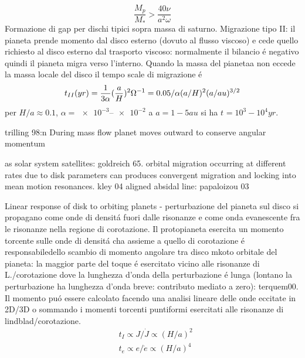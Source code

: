 \begin{workout}
\begin{equation}
\frac{M_p}{M_*}>\frac{40\nu}{a^2\omega}
\end{equation}
Formazione di gap per dischi tipici sopra massa di saturno.
Migrazione tipo II: il pianeta prende momento dal disco esterno (dovuto al flusso viscoso) e cede quello richiesto al disco esterno dal trasporto viscoso: normalmente il bilancio \'e negativo quindi il pianeta migra verso l'interno.
Quando la massa del pianetaa non eccede la massa locale del disco il tempo scale di migrazione \'e
\begin{equation}
t_{II}(yr)=\frac{1}{3\alpha}(\frac{a}{H})^2\Omega^{-1}=0.05/\alpha(a/H)^2(a/au)^{3/2}
\end{equation}
per $H/a\approx0.1$, $\alpha=\numrange{e-3}{e-2}$ a $a=1-5 au$ si ha $t_{}=10^3-10^4yr$.

\end{workout}

\begin{workout}
trilling 98:n During mass flow planet moves outward to conserve angular momentum
\end{workout}

\begin{workout}
as solar system satellites: goldreich 65.
orbital migration occurring at different rates due to disk parameters can produces convergent migration and locking into mean motion resonances.
kley 04
aligned absidal line: papaloizou 03
\end{workout}

\begin{workout}
Linear response of disk to orbiting planets - perturbazione del pianeta sul disco si propagano come onde di densit\'a fuori dalle risonanze e come onda evanescente fra le risonanze nella regione di corotazione. Il protopianeta esercita un momento torcente sulle onde di densit\'a cha assieme  a quello di corotazione \'e responsabiledello scambio di momento angolare tra disco mkoto orbitale del pianeta: la maggior parte del toque \'e esercitato vicino alle risonanze di L./corotazione dove la lunghezza d'onda della perturbazione \'e lunga (lontano la perturbazione ha lunghezza d'onda breve: contributo mediato a zero): terquem00.
Il momento pu\'o essere calcolato facendo una analisi lineare delle onde eccitate in 2D/3D o sommando i momenti torcenti puntiformi esercitati alle risonanze di lindblad/corotazione.
\begin{align}
&t_I\propto J/\dot{J}\propto(H/a)^2\\
&t_e\propto e/\dot{e}\propto(H/a)^4
\end{align}
\end{workout}

